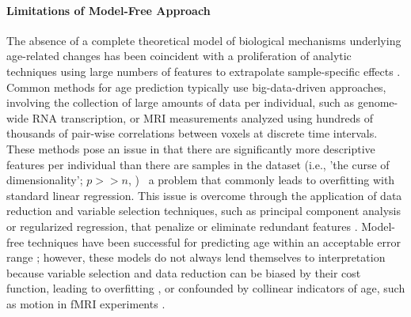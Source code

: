 \documentclass{article}%
\begin{document}
\paragraph*{Limitations of Model-Free Approach} 
The absence of a complete theoretical model of biological mechanisms underlying age-related changes has been coincident with a proliferation of analytic techniques using large numbers of features to extrapolate sample-specific effects \citep{sagers2020prediction,crimmins2008biomarkers}. Common methods for age prediction typically use big-data-driven approaches, involving the collection of large amounts of data per individual, such as genome-wide RNA transcription, or MRI measurements analyzed using hundreds of thousands of pair-wise correlations between voxels at discrete time intervals. These methods pose an issue in that there are significantly more descriptive features per individual than there are samples in the dataset (i.e., 'the curse of dimensionality'; $p >> n$, \cite{taylor2019}) \textemdash \ a problem that commonly leads to overfitting with standard linear regression. This issue is overcome through the application of data reduction and variable selection techniques, such as principal component analysis or regularized regression, that penalize or eliminate redundant features \citep{lee2017medical}. Model-free techniques have been successful for predicting age within an acceptable error range \citep{cole2017predicting}; however, these models do not always lend themselves to interpretation because variable selection and data reduction can be biased by their cost function, leading to overfitting \citep{babyak2004you}, or confounded by collinear indicators of age, such as motion in fMRI experiments \citep{satterthwaite2013heterogeneous}.
%
\end{document}
